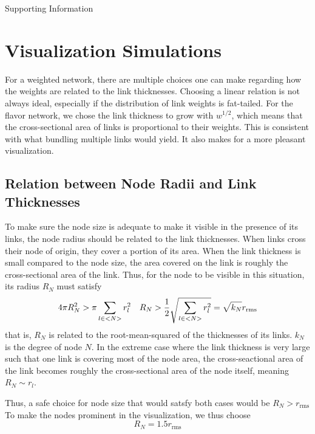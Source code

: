 \documentclass[nofootinbib,preprint,floatfix,titlepage,endfloats,superscriptaddress]{revtex4} %
\begin{document}
\newpage


\appendix
{\Huge Supporting Information}

\section{Visualization Simulations\label{ap:params}}
For a weighted network, there are multiple choices one can make regarding how the weights are related to the link thicknesses.
Choosing a linear relation is not always ideal, especially if the distribution of link weights is fat-tailed. 
For the flavor network, we chose the link thickness to grow with $w^{1/2}$, which means that the cross-sectional area of links is proportional to their weights. 
This is consistent with what bundling multiple links would yield. 
It also makes for a more pleasant visualization. 

\subsection{Relation between Node Radii and Link Thicknesses}
To make sure the node size is adequate to make it visible in the presence of its links, the node radius should be related to the link thicknesses. 
When links cross their node of origin, they cover a portion of its area.
When the link thickness is small compared to the node size, the area covered on the link is roughly the cross-sectional area of the link. 
Thus, for the node to be visible in this situation, its radius $R_N$ must satisfy
\begin{equation}
    4 \pi R_N^2 > \pi \sum_{l\in <N>} r_l^2 \quad R_N > {1\over 2} \sqrt{\sum_{l\in <N>} r_l^2} = \sqrt{k_N} r_{\mathrm{rms}}  
\end{equation}
that is, $R_N$ is related to the root-mean-squared of the thicknesses of its links. $k_N$ is the degree of node $N$.  
In the extreme case where the link thickness is very large such that one link is covering most of the node area, the cross-seactional area of the link becomes roughly the cross-sectional area of the node itself, meaning $R_N \sim r_l$. 

Thus, a safe choice for node size that would satsfy both cases would be 
$R_N > r_{\mathrm{rms}}$
To make the nodes prominent in the visualization, we thus choose 
\[R_N = 1.5 r_{\mathrm{rms}}\]
\end{document}
